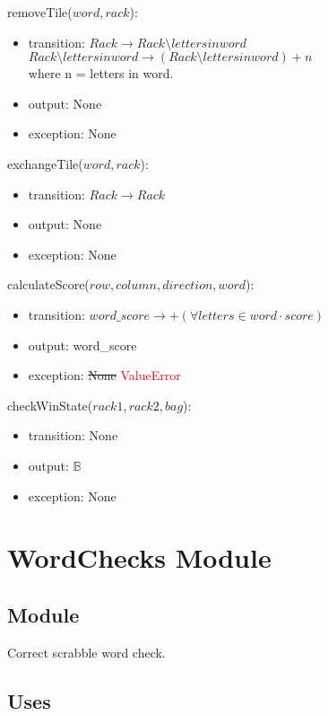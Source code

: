 \documentclass[12pt]{article}
\begin{document}
\noindent removeTile($word, rack$):
\begin{itemize}
\item transition: $Rack \rightarrow Rack \setminus {letters in word}$ \\
$Rack \setminus {letters in word} \rightarrow (Rack \setminus {letters in word}) + n$\\
where n = letters in word.
\item output: None
\item exception: None
\end{itemize}

\noindent exchangeTile($word, rack$):
\begin{itemize}
\item transition: $Rack \rightarrow Rack$
\item output: None
\item exception: None
\end{itemize}

\noindent calculateScore($row, column, direction, word$):
\begin{itemize}
\item transition: $word\_score \rightarrow +(\forall letters \in word \cdot score)$
\item output: word\_score
\item exception: \sout{None} \textcolor{red}{ValueError}
\end{itemize}

\noindent checkWinState($rack1, rack2, bag$):
\begin{itemize}
\item transition: None
\item output: $\mathbb{B}$
\item exception: None
\end{itemize}

\newpage

\section* {WordChecks Module}

\subsection*{Module}

Correct scrabble word check.

\subsection* {Uses}
\end{document}
